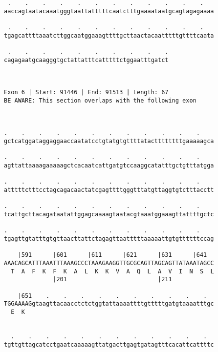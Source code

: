 \documentclass{article}
\begin{document}
\begin{Verbatim}
 .    .    .    .    .    .    .    .    .    .    .    .   
aaccagtaatacaaatgggtaattatttttcaatctttgaaaataatgcagtagagaaaa
                                                            
 .    .    .    .    .    .    .    .    .    .    .    .   
tgagcattttaaatcttggcaatggaaagttttgcttaactacaatttttgttttcaata
                                                            
 .    .    .    .    .    .    .    .    .    .
cagagaatgcaagggtgctattatttcatttttctggaatttgatct
                                               
                                               
 
Exon 6 | Start: 91446 | End: 91513 | Length: 67
BE AWARE: This section overlaps with the following exon



.    .    .    .    .    .    .    .    .    .    .    .    
gctcatggataggaggaaccaatatcctgtatgtgttttatacttttttttgaaaaagca
                                                            
.    .    .    .    .    .    .    .    .    .    .    .    
agttattaaaagaaaaagctcacaatcattgatgtccaaggcatatttgctgtttatgga
                                                            
.    .    .    .    .    .    .    .    .    .    .    .    
atttttctttcctagcagacaactatcgagttttgggtttatgttaggtgtctttacctt
                                                            
.    .    .    .    .    .    .    .    .    .    .    .    
tcattgcttacagataatattggagcaaaagtaatacgtaaatggaaagttattttgctc
                                                            
.    .    .    .    .    .    .    .    .    .    .    .    
tgagttgtatttgtgttaacttattctagagttaatttttaaaaattgtgttttttccag
                                                            
    |591      |601      |611      |621      |631      |641  
AAACAGCATTTAAATTTAAAGCCCTAAAGAAGGTTGCGCAGTTAGCAGTTATAAATAGCC
  T  A  F  K  F  K  A  L  K  K  V  A  Q  L  A  V  I  N  S  L
              |201                          |211            
  
    |651    .    .    .    .    .    .    .    .    .    .  
TGGAAAAGgtaagttacaacctctctggtattaaaattttgtttttgatgtaaaatttgc
  E  K                                                      
                                                            
  
  .    .    .    .    .    .    .    .    .    .    .    .  
tgttgttagcatcctgaatcaaaaagttatgacttgagtgatagtttcacattcattttc
                                                            

\end{Verbatim}
\end{document}

